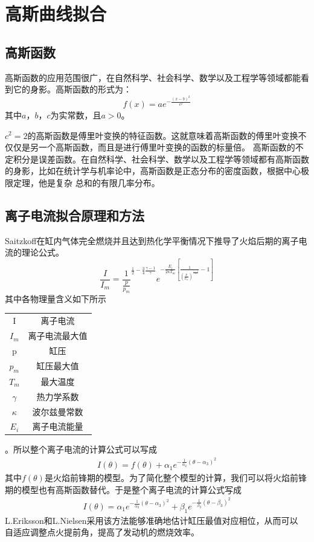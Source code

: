 \section{高斯曲线拟合}
\subsection{高斯函数}
高斯函数的应用范围很广，在自然科学、社会科学、数学以及工程学等领域都能看到它的身影。高斯函数的形式为：
\begin{equation}
	f(x)=ae^{-\frac{(x-b)^2}{c^2}}
\end{equation}
其中$a$，$b$，$c$为实常数，且$a>0$。
\par $c^2=2$的高斯函数是傅里叶变换的特征函数。这就意味着高斯函数的傅里叶变换不仅仅是另一个高斯函数，而且是进行傅里叶变换的函数的标量倍。
高斯函数的不定积分是误差函数。在自然科学、社会科学、数学以及工程学等领域都有高斯函数的身影，比如在统计学与机率论中，高斯函数是正态分布的密度函数，根据中心极限定理，他是复杂
总和的有限几率分布。
\subsection{离子电流拟合原理和方法}
Saitzkoff\cite{saitzkoff1996ionization}在缸内气体完全燃烧并且达到热化学平衡情况下推导了火焰后期的离子电流的理论公式。
\begin{equation}
	\frac{I}{I_{m}}=\frac{1}{\frac{p}{p_m}}^{\frac{1}{2}-\frac{3}{4}\frac{\gamma -1}{\gamma}}e^{-\frac{E_i}{2\kappa T_m}[\frac{1}{(\frac{p}{p_m})^{\frac{\gamma -1}{\gamma}}}-1]}
\end{equation}
其中各物理量含义如下所示\par
\begin{table}[H]
	\centering
	\begin{tabular}{cc}
	I&离子电流\\
	$I_m$&离子电流最大值\\
	p&缸压\\
	$p_m$&缸压最大值\\
	$T_m$&最大温度\\
	$\gamma$&热力学系数\\
	$\kappa$&波尔兹曼常数\\
	$E_i$&离子电流能量
	\end{tabular}
\end{table}
。所以整个离子电流的计算公式可以写成
\begin{gather}
	I(\theta)=f(\theta)+\alpha_{1}e^{-\frac{1}{\alpha_{2}}(\theta - \alpha_{3})^2} \label{eqn:interp1}
\end{gather}
其中$f(\theta)$是火焰前锋期的模型。为了简化整个模型的计算，我们可以将火焰前锋期的模型也有高斯函数替代。于是整个离子电流的计算公式写成
\begin{gather}
	I(\theta)=\alpha_{1}e^{-\frac{1}{\alpha_{2}}(\theta - \alpha_{3})^2}+\beta_{1}e^{-\frac{1}{\beta_{2}}(\theta - \beta_{3})^2}
	\label{eqn:interp2}
\end{gather}
L.Eriksson和L.Nielsen\cite{eriksson1996ignition,eriksson1997closed,eriksson1997ionization}采用该方法能够准确地估计缸压最值对应相位，从而可以
自适应调整点火提前角，提高了发动机的燃烧效率。




